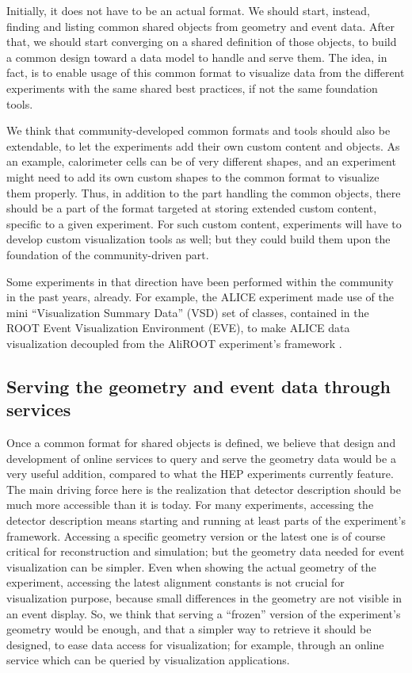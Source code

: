 \documentclass[12pt,a4paper]{article}
\begin{document}
Initially, it does not have to be an actual format. We should start, instead, finding and listing common shared objects from geometry and event data. After that, we should start converging on a shared definition of those objects, to build a common design toward a data model to handle and serve them. The idea, in fact, is to enable usage of this common format to visualize data from the different experiments with the same shared best practices, if not the same foundation tools.

We think that community-developed common formats and tools should also be extendable, to let the experiments add their own custom content and objects. As an example, calorimeter cells can be of very different shapes, and an experiment might need to add its own custom shapes to the common format to visualize them properly. Thus, in addition to the part handling the common objects, there should be a part of the format targeted at storing extended custom content, specific to a given experiment. For such custom content, experiments will have to develop custom visualization tools as well; but they could build them upon the foundation
of the community-driven part.

Some experiments in that direction have been performed within the community in the past years, already. For example, the ALICE experiment made use of the mini ``Visualization Summary Data'' (VSD) set of classes, contained in the ROOT Event Visualization Environment (EVE), to make ALICE data visualization decoupled from the AliROOT experiment’s framework \cite{TadelALICE}.

\hypertarget{serving-data}{%
\subsection{Serving the geometry and event data through services}\label{serving-data}}

Once a common format for shared objects is defined, we believe that design and development of online services to query and serve the geometry data would be a very useful addition, compared to what the HEP experiments currently feature.
The main driving force here is the realization that detector description should be much more accessible than it is today. For many experiments, accessing the detector description means starting and running at least parts of the experiment’s framework. Accessing a specific geometry version or the latest one is of course critical for reconstruction and simulation; but the geometry data needed for event visualization can be simpler. Even when showing the actual geometry of the experiment, accessing the latest alignment constants is not crucial for visualization purpose, because small differences in the geometry are not visible in an event display.
So, we think that serving a “frozen” version of the experiment’s geometry would be enough, and that a simpler way to retrieve it should be designed, to ease data access for visualization; for example, through an online service which can be queried by visualization applications.
\end{document}
